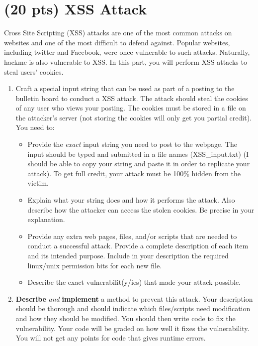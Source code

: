 \documentclass[]{article}
\begin{document}
\section{(20 pts) XSS Attack}

Cross Site Scripting (XSS) attacks are one of the most common attacks on websites and one of the most difficult to defend against. Popular websites, including twitter and Facebook, were once vulnerable to such attacks. Naturally, hackme is also vulnerable to XSS. In this part, you will perform XSS attacks to steal users' cookies.

\begin{enumerate}
	\item Craft a special input string that can be used as part of a posting to the bulletin board to conduct a XSS attack. The attack should steal the cookies of any user who views your posting. The cookies must be stored in a file on the attacker's server (not storing the cookies will only get you partial credit). You need to:
		\begin{itemize}
			\item Provide the \emph{exact} input string you need to post to the webpage. The input should be typed and submitted in a file names (XSS\_input.txt) (I should be able to copy your string and paste it in order to replicate your attack). To get full credit, your attack must be 100\% hidden from the victim.
			\item Explain what your string does and how it performs the attack. Also describe how the attacker can access the stolen cookies. Be precise in your explanation.
			\item Provide any extra web pages, files, and/or scripts that are needed to conduct a successful attack. Provide a complete description of each item and its intended purpose. Include in your description the required linux/unix permission bits for each new file.
			\item Describe the exact vulnerabilit(y/ies) that made your attack possible.
		\end{itemize}
	\item \textbf{Describe} \emph{and} \textbf{implement} a method to prevent this attack. Your description should be thorough and should indicate which files/scripts need modification and how they should be modified. You should then write code to fix the vulnerability. Your code will be graded on how well it fixes the vulnerability. You will not get any points for code that gives runtime errors.
\end{enumerate} 
\end{document}

